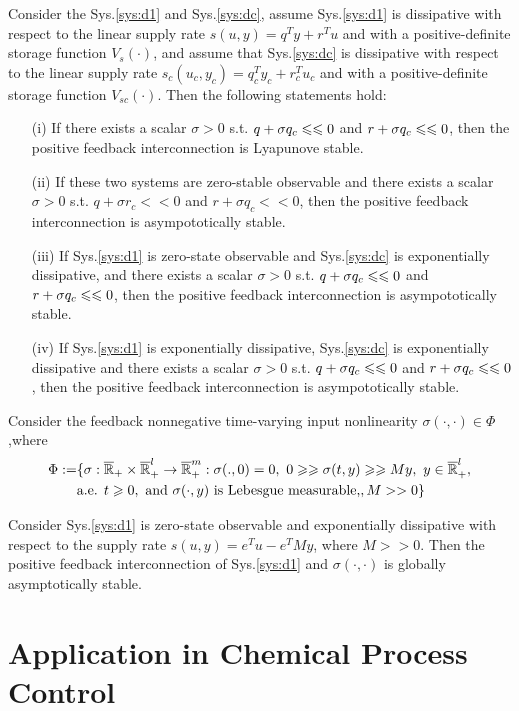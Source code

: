 \documentclass{paper}
\begin{document}
\begin{thm}
Consider the Sys.\ref{sys:d1} and Sys.\ref{sys:dc}, assume Sys.\ref{sys:d1} is dissipative with respect to the linear supply rate
$s(u,y)=q^Ty+r^Tu$ and with a positive-definite storage function $V_s(\cdot)$, and assume that Sys.\ref{sys:dc} is dissipative 
with respect to the linear supply rate $s_c(u_c,y_c)=q_c^Ty_c+r_c^Tu_c$ and with a positive-definite storage function $V_{sc}(\cdot)$.
Then the following statements hold:
\begin{enumerate}
\item[(i)]   If there exists a scalar $\sigma>0$ s.t. $q+\sigma q_c\leqslant\leqslant 0$ and $r+\sigma q_c\leqslant\leqslant 0$, then the positive feedback interconnection
is Lyapunove stable.
\item[(ii)]  If these two systems are zero-stable observable and there exists a scalar $\sigma>0$ s.t. $q+\sigma r_c<<0$ and 
$r+\sigma q_c<<0$, then the positive feedback interconnection is asympototically stable.
\item[(iii)] If Sys.\ref{sys:d1} is zero-state observable and Sys.\ref{sys:dc} is exponentially dissipative, and there exists 
a scalar $\sigma>0$ s.t. $q+\sigma q_c\leqslant\leqslant 0$ and $r+\sigma q_c\leqslant\leqslant 0$, then the positive feedback interconnection is asympototically stable.
\item[(iv)]  If Sys.\ref{sys:d1} is exponentially dissipative, Sys.\ref{sys:dc} is exponentially dissipative and there exists 
a scalar $\sigma>0$ s.t. $q+\sigma q_c\leqslant\leqslant 0$ and $r+\sigma q_c\leqslant\leqslant 0$, then the positive feedback interconnection is asympototically stable.
\end{enumerate}
\end{thm}
Consider the feedback nonnegative time-varying input nonlinearity $\sigma(\cdot,\cdot)\in\Phi$,where
\begin{align}
\Phi:=&\lbrace\sigma:\overline{\mathbb{R}}_{+}\times\overline{\mathbb{R}}_{+}^l\rightarrow \overline{\mathbb{R}}_{+}^m: 
\sigma(.,0)=0,\text{ }0\geqslant\geqslant\sigma(t,y)\geqslant\geqslant My,\text{ } y\in\overline{\mathbb{R}}_{+}^l, \nonumber \\
\qquad &\text{a.e. } t\geqslant 0, \text{ and } \sigma(\cdot,y) \text{ is Lebesgue measurable,}, M>>0 \rbrace
\end{align}
\begin{thm}
Consider Sys.\ref{sys:d1} is zero-state observable and exponentially dissipative with respect to the supply rate $s(u,y)=e^Tu-e^TMy$, where
$M>>0$. Then the positive feedback interconnection of Sys.\ref{sys:d1} and $\sigma(\cdot,\cdot)$ is globally asymptotically stable.
\end{thm}
\section{Application in Chemical Process Control}



\end{document}
